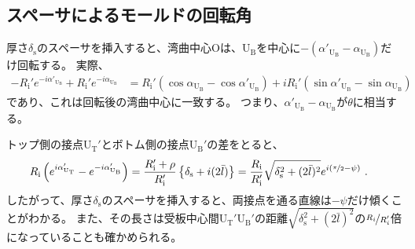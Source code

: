 \subsection{スペーサによるモールドの回転角}
厚さ$\delta_\mathrm s$のスペーサを挿入すると、湾曲中心Oは、U$_\mathrm B$を中心に$-\left(\alpha'_{\mathrm U_\mathrm B}\!-\alpha_{\mathrm U_\mathrm B}\right)$だけ回転する。
実際、
\begin{align*}
  -R_\mathrm i'e^{-i\alpha'_{\mathrm U_\mathrm B}}+R_\mathrm i'e^{-i\alpha_{\mathrm U_\mathrm B}}
  &= R_\mathrm i'(\cos\alpha_{\mathrm U_\mathrm B}-\cos\alpha'_{\mathrm U_\mathrm B})
     +iR_\mathrm i'(\sin\alpha'_{\mathrm U_\mathrm B}-\sin\alpha_{\mathrm U_\mathrm B})
\end{align*}
であり、これは回転後の湾曲中心に一致する。
つまり、$\alpha'_{\mathrm U_\mathrm B}\!-\alpha_{\mathrm U_\mathrm B}$が$\theta$に相当する。
\begin{hosoku}
トップ側の接点U$_\mathrm T'$とボトム側の接点U$_\mathrm B'$の差をとると、
\begin{align*}
  R_\mathrm i\left(e^{i\alpha_{\mathrm U_\mathrm T}'}-e^{-i\alpha'_{\mathrm U_\mathrm B}}\right)
  &= \frac{R_\mathrm i'+\rho}{R_\mathrm i'}\left\{\delta_\mathrm s+i(2\bar l)\right\}
   = \frac{R_\mathrm i}{R_\mathrm i'}\sqrt{\delta_\mathrm s^2+(2\bar l)^2}e^{i(\nicefrac\pi2-\psi)}\ .
\end{align*}
したがって、厚さ$\delta_\mathrm s$のスペーサを挿入すると、両接点を通る直線は$-\psi$だけ傾くことがわかる。
また、その長さは受板中心間U$_\mathrm T'$U$_\mathrm B'$の距離$\sqrt{\delta_\mathrm s^2+(2\bar l)^2}$の$\nicefrac{R_i}{R_i'}$倍になっていることも確かめられる。
\end{hosoku}



